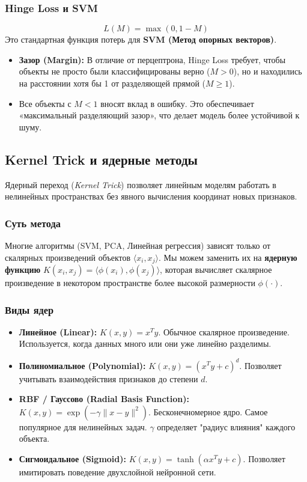 \documentclass[12pt]{article}
\begin{document}
\subsubsection{Hinge Loss и SVM}
\[ L(M) = \max(0, 1 - M) \]
Это стандартная функция потерь для \textbf{SVM (Метод опорных векторов)}.
\begin{itemize}
    \item \textbf{Зазор (Margin):} В отличие от перцептрона, Hinge Loss требует, чтобы объекты не просто были классифицированы верно ($M>0$), но и находились на расстоянии хотя бы 1 от разделяющей прямой ($M \ge 1$).
    \item Все объекты с $M < 1$ вносят вклад в ошибку. Это обеспечивает «максимальный разделяющий зазор», что делает модель более устойчивой к шуму.
\end{itemize}

\newpage
\subsection{Kernel Trick и ядерные методы}
Ядерный переход (\textit{Kernel Trick}) позволяет линейным моделям работать в нелинейных пространствах без явного вычисления координат новых признаков.

\subsubsection{Суть метода}
Многие алгоритмы (SVM, PCA, Линейная регрессия) зависят только от скалярных произведений объектов $\langle x_i, x_j \rangle$. Мы можем заменить их на \textbf{ядерную функцию} $K(x_i, x_j) = \langle \phi(x_i), \phi(x_j) \rangle$, которая вычисляет скалярное произведение в некотором пространстве более высокой размерности $\phi(\cdot)$.

\subsubsection{Виды ядер}
\begin{itemize}
    \item \textbf{Линейное (Linear):} $K(x, y) = x^T y$. Обычное скалярное произведение. Используется, когда данных много или они уже линейно разделимы.
    \item \textbf{Полиномиальное (Polynomial):} $K(x, y) = (x^T y + c)^d$. Позволяет учитывать взаимодействия признаков до степени $d$.
    \item \textbf{RBF / Гауссово (Radial Basis Function):} $K(x, y) = \exp(-\gamma \|x - y\|^2)$. Бесконечномерное ядро. Самое популярное для нелинейных задач. $\gamma$ определяет "радиус влияния" каждого объекта.
    \item \textbf{Сигмоидальное (Sigmoid):} $K(x, y) = \tanh(\alpha x^T y + c)$. Позволяет имитировать поведение двухслойной нейронной сети.
\end{itemize}
\end{document}
